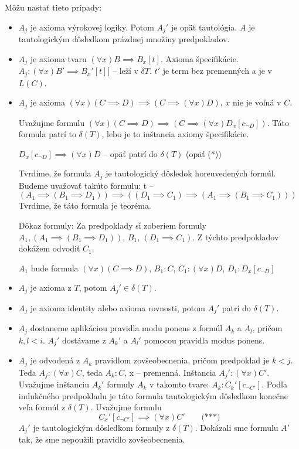 \par Môžu nastať tieto prípady:
\begin{itemize}
	\item $A_j$ je axioma výrokovej logiky. Potom $A_j'$ je opäť tautológia.
	$A$ je tautologickým dôsledkom prázdnej množiny predpokladov.
	\item $A_j$ je axioma tvaru $(\forall x) B \implies B_x[t]$. Axioma
	špecifikácie. $A_j: (\forall x) B' \implies B_x'[t]]$ -- leží v
	$\delta T$. $t'$ je term bez premenných a je v $L(C)$. 
	\item $A_j$ je axioma $(\forall x) (C \implies D) \implies (C \implies
	(\forall x) D)$, $x$ nie je voľná v $C$.
	\par Uvažujme formulu $(\forall x) (C \implies D) \implies (C \implies
	(\forall x) D_x[c_{\neg D}])$. Táto formula patrí to $\delta(T)$, lebo
	je to inštancia axiomy špecifikácie.
	\par $ D_x[c_{\neg D}] \implies (\forall x) D$ -- opäť patrí do
	$\delta(T)$ (opäť (*))
	\par Tvrdíme, že formula $A_j$ je tautologický dôsledok horeuvedených 
	formúl. Budeme uvažovať takúto formulu:
	t -- $(A_1 \implies (B_1 \implies D_1)) \implies ((D_1 \implies C_1)
	\implies (A_1 \implies (B_1 \implies C_1)))$ Tvrdíme, že táto formula
	je teoréma.

	\par Dôkaz formuly: Za predpoklady si zoberiem formuly $A_1, (A_1
	\implies (B_1 \implies D_1))$, $B_1$, $(D_1 \implies C_1)$. Z týchto
	predpokladov dokážem odvodiť $C_1$.

	\par $A_1$ bude formula $(\forall x)(C \implies D)$, $B_1: C$, $C_1:
	(\forall x) D$, $D_1: D_x[c_{\neg D}]$

	\item $A_j$ je axioma z $T$, potom $A_j' \in \delta(T)$.
	\item $A_j$ je axioma identity alebo axioma rovnosti, potom $A_j'$ patrí
	do $\delta(T)$.

	\item $A_j$ dostaneme aplikáciou pravidla modu
	ponens z formúl $A_k$ a $A_l$, pričom $k, l < i$. $A_j'$ dostávame z
	$A_k'$ a $A_l'$ pomocou pravidla modus ponens.
	\item $A_j$ je odvodená z $A_k$ pravidlom zovšeobecnenia, pričom
	predpoklad je $k<j$. Teda $A_j: (\forall x) C$, teda $A_k: C$, x --
	premenná. Inštancia $A_j': (\forall x) C'$. Uvažujme inštanciu $A_k'$
	formuly $A_k$ v takomto tvare: $A_k:  C_k'[c_{\neg C'}]$. Podľa
	indukčného predpokladu je táto formula tautologickým dôsledkom konečne
	veľa formúl z $\delta (T)$. Uvažujme formulu $$C_x'[c_{\neg C'}]
	\implies (\forall x) C' \qquad \mbox{(***)}$$
	$A_j'$ je tautologickým dôsledkom formuly z $\delta(T)$. Dokázali sme
	formulu $A'$ tak, že sme nepoužili pravidlo zovšeobecnenia.
\end{itemize} 

